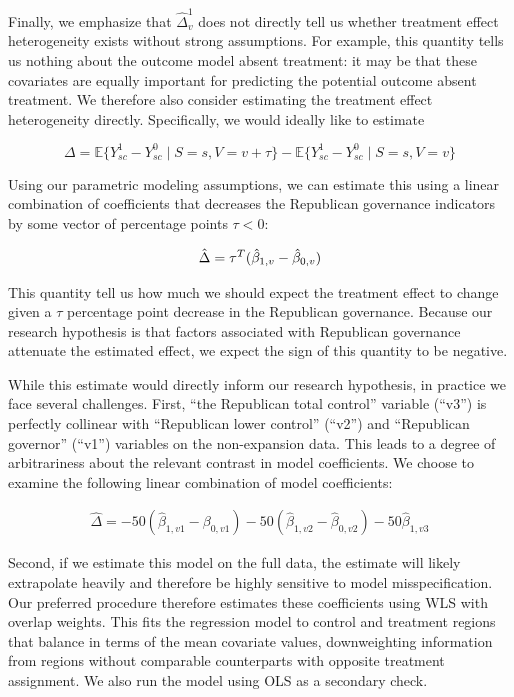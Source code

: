 \documentclass[aoas]{imsart}
\theoremstyle{plain}
\theoremstyle{remark}
\begin{document}
Finally, we emphasize that $\hat{\Delta}^1_v$ does not directly tell us whether treatment effect heterogeneity exists without strong assumptions. For example, this quantity tells us nothing about the outcome model absent treatment: it may be that these covariates are equally important for predicting the potential outcome absent treatment. We therefore also consider estimating the treatment effect heterogeneity directly. Specifically, we would ideally like to estimate

\begin{equation}
    \Delta = \mathbb{E}\{Y^1_{sc} - Y^0_{sc} \mid S = s, V = v + \tau\} - \mathbb{E}\{Y^1_{sc} - Y^0_{sc} \mid S = s, V = v\}
\end{equation}

Using our parametric modeling assumptions, we can estimate this using a linear combination of coefficients that decreases the Republican governance indicators by some vector of percentage points $\tau < 0$: 

\begin{equation}
    \hat{\Delta} = \tau^T(\hat{\beta}_{1, v} - \hat{\beta}_{0, v}) \\
\end{equation}

This quantity tell us how much we should expect the treatment effect to change given a $\tau$ percentage point decrease in the Republican governance. Because our research hypothesis is that factors associated with Republican governance attenuate the estimated effect, we expect the sign of this quantity to be negative. 

While this estimate would directly inform our research hypothesis, in practice we face several challenges. First, ``the Republican total control'' variable (``v3'') is perfectly collinear with ``Republican lower control'' (``v2'') and ``Republican governor'' (``v1'') variables on the non-expansion data. This leads to a degree of arbitrariness about the relevant contrast in model coefficients. We choose to examine the following linear combination of model coefficients:

\begin{align*}
\hat{\Delta} = -50(\hat{\beta}_{1, v1} - \beta_{0, v1}) - 50(\hat{\beta}_{1, v2} - \hat{\beta}_{0, v2}) - 50\hat{\beta}_{1, v3}
\end{align*}

Second, if we estimate this model on the full data, the estimate will likely extrapolate heavily and therefore be highly sensitive to model misspecification. Our preferred procedure therefore estimates these coefficients using WLS with overlap weights. This fits the regression model to control and treatment regions that balance in terms of the mean covariate values, downweighting information from regions without comparable counterparts with opposite treatment assignment. We also run the model using OLS as a secondary check.
\end{document}
